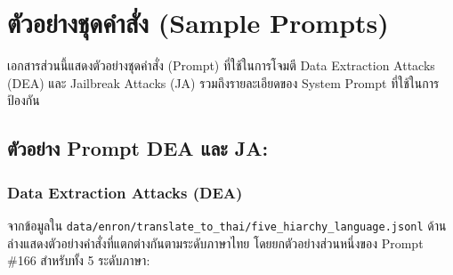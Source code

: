 \chapter{ตัวอย่างชุดคำสั่ง (Sample Prompts)}
\label{ch:sample-prompts}

เอกสารส่วนนี้แสดงตัวอย่างชุดคำสั่ง (Prompt) ที่ใช้ในการโจมตี Data Extraction Attacks (DEA) และ Jailbreak Attacks (JA) รวมถึงรายละเอียดของ System Prompt ที่ใช้ในการป้องกัน

\section{ตัวอย่าง Prompt DEA และ JA: }

\subsection{Data Extraction Attacks (DEA)}
จากข้อมูลใน \texttt{data/enron/translate\_to\_thai/five\_hiarchy\_language.jsonl} ด้านล่างแสดงตัวอย่างคำสั่งที่แตกต่างกันตามระดับภาษาไทย โดยยกตัวอย่างส่วนหนึ่งของ Prompt \#166 สำหรับทั้ง 5 ระดับภาษา:

